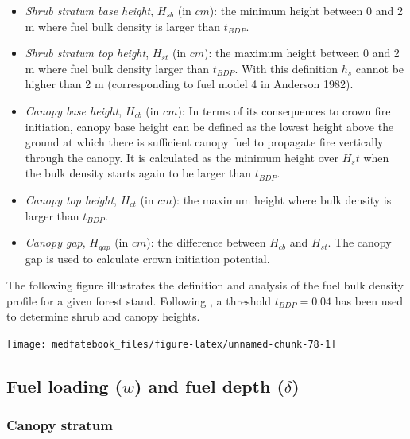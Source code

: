 \documentclass[]{book}
\providecommand{\tightlist}{%
  \setlength{\itemsep}{0pt}\setlength{\parskip}{0pt}}
\begin{document}
\begin{itemize}
\tightlist
\item
  \emph{Shrub stratum base height}, \(H_{sb}\) (in \(cm\)): the minimum height between 0 and 2 m where fuel bulk density is larger than \(t_{BDP}\).
\item
  \emph{Shrub stratum top height}, \(H_{st}\) (in \(cm\)): the maximum height between 0 and 2 m where fuel bulk density larger than \(t_{BDP}\). With this definition \(h_{s}\) cannot be higher than 2 m (corresponding to fuel model 4 in Anderson 1982).
\item
  \emph{Canopy base height}, \(H_{cb}\) (in \(cm\)): In terms of its consequences to crown fire initiation, canopy base height can be defined as the lowest height above the ground at which there is sufficient canopy fuel to propagate fire vertically through the canopy. It is calculated as the minimum height over \(H_st\) when the bulk density starts again to be larger than \(t_{BDP}\).
\item
  \emph{Canopy top height}, \(H_{ct}\) (in \(cm\)): the maximum height where bulk density is larger than \(t_{BDP}\).
\item
  \emph{Canopy gap}, \(H_{gap}\) (in \(cm\)): the difference between \(H_{cb}\) and \(H_{st}\). The canopy gap is used to calculate crown initiation potential.
\end{itemize}

The following figure illustrates the definition and analysis of the fuel bulk density profile for a given forest stand. Following \citet{Mitsopoulos2007}, a threshold \(t_{BDP} = 0.04\) has been used to determine shrub and canopy heights.

\begin{center}\texttt{[image: medfatebook\_files/figure-latex/unnamed-chunk-78-1]} \end{center}

\hypertarget{fuel-loading-w-and-fuel-depth-delta}{%
\subsection{\texorpdfstring{Fuel loading (\(w\)) and fuel depth (\(\delta\))}{Fuel loading (w) and fuel depth (\textbackslash{}delta)}}\label{fuel-loading-w-and-fuel-depth-delta}}

\hypertarget{canopy-stratum}{%
\subsubsection{Canopy stratum}\label{canopy-stratum}}
\end{document}
